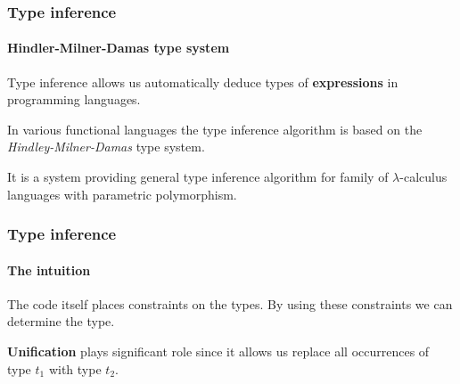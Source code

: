 \documentclass{beamer}
\newcommand{\vpad}{\vspace{5pt}}
\newcommand{\vPad}{\vspace{10pt}}
\begin{document}
\begin{frame} \frametitle{Type inference}
  \framesubtitle{Hindler-Milner-Damas type system}
  Type inference allows us automatically deduce types of \textbf{expressions} in programming languages.

  \vPad
  In various functional languages the type inference algorithm is based on the \textit{Hindley-Milner-Damas}
  type system.

  \vpad
  It is a system providing general type inference algorithm for family of $\lambda$-calculus languages
  with parametric polymorphism.
\end{frame}

\begin{frame} \frametitle{Type inference}
  \framesubtitle{The intuition}
  The code itself places constraints on the types. By using these constraints we can determine the type.

  \vpad
  \textbf{Unification} plays significant role since it allows us replace all occurrences of type $t_1$ with type $t_2$.
\end{frame}




\end{document}
